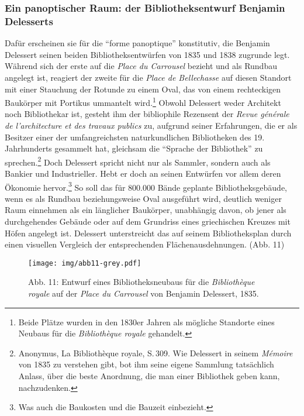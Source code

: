 \subsubsection{Ein panoptischer Raum: der Bibliotheksentwurf Benjamin
Delesserts}\label{ein-panoptischer-raum-der-bibliotheksentwurf-benjamin-delesserts}

Dafür erscheinen sie für die \enquote{forme panoptique} konstitutiv, die
Benjamin Delessert seinen beiden Bibliotheksentwürfen von 1835 und 1838
zugrunde legt. Während sich der erste auf die \emph{Place du Carrousel}
bezieht und als Rundbau angelegt ist, reagiert der zweite für die
\emph{Place de Bellechasse} auf diesen Standort mit einer Stauchung der
Rotunde zu einem Oval, das von einem rechteckigen Baukörper mit Portikus
ummantelt wird.\footnote{Beide Plätze wurden in den 1830er Jahren als
  mögliche Standorte eines Neubaus für die \emph{Bibliothèque royale}
  gehandelt.} Obwohl Delessert weder Architekt noch Bibliothekar ist,
gesteht ihm der bibliophile Rezensent der \emph{Revue générale de
l'architecture et des travaux publics} zu, aufgrund seiner Erfahrungen,
die er als Besitzer einer der umfangreichsten naturkundlichen
Bibliotheken des 19. Jahrhunderts gesammelt hat, gleichsam die
\enquote{Sprache der Bibliothek} zu sprechen.\footnote{Anonymus, La
  Bibliothèque royale, S.\,309. Wie Delessert in seinem \emph{Mémoire}
  von 1835 zu verstehen gibt, bot ihm seine eigene Sammlung tatsächlich
  Anlass, über die beste Anordnung, die man einer Bibliothek geben kann,
  nachzudenken.} Doch Delessert spricht nicht nur als Sammler, sondern
auch als Bankier und Industrieller. Hebt er doch an seinen Entwürfen vor
allem deren Ökonomie hervor.\footnote{Was auch die Baukosten und die
  Bauzeit einbezieht.} So soll das für 800.000 Bände geplante
Bibliotheksgebäude, wenn es als Rundbau beziehungsweise Oval ausgeführt
wird, deutlich weniger Raum einnehmen als ein länglicher Baukörper,
unabhängig davon, ob jener als durchgehendes Gebäude oder auf dem
Grundriss eines griechischen Kreuzes mit Höfen angelegt ist. Delessert
unterstreicht das auf seinem Bibliotheksplan durch einen visuellen
Vergleich der entsprechenden Flächenausdehnungen. (Abb. 11)

\begin{figure}[htbp]
\centering
\texttt{[image: img/abb11-grey.pdf]}
\caption*{Abb. 11: Entwurf eines Bibliotheksneubaus für die
\emph{Bibliothèque royale} auf der \emph{Place du Carrousel} von
Benjamin Delessert, 1835.}
\end{figure}


